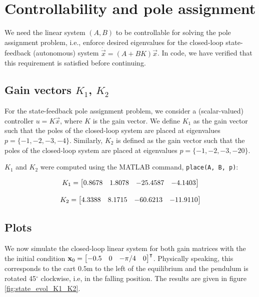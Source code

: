 \documentclass[10pt]{article}
\begin{document}
\section{Controllability and pole assignment}
We need the linear system $(A,B)$ to be controllable for solving the pole assignment problem, i.e., enforce desired eigenvalues for the closed-loop state-feedback (autonomous) system $\dot{\vec{x}} = (A + BK)\vec{x}$. In code, we have verified that this requirement is satisfied before continuing.

\subsection{Gain vectors \texorpdfstring{$K_1$}{K1}, \texorpdfstring{$K_2$}{K2}}
For the state-feedback pole assignment problem, we consider a (scalar-valued) controller $u = K\vec{x}$, where $K$ is the gain vector. We define $K_1$ as the gain vector such that the poles of the closed-loop system are placed at eigenvalues $p =\{-1, -2, -3, -4\}$. Similarly, $K_2$ is defined as the gain vector such that the poles of the closed-loop system are placed at eigenvalues $p =\{-1, -2, -3, -20\}$.

$K_1$ and $K_2$ were computed using the \textsc{MATLAB} command, \texttt{place(A, B, p)}:

\begin{equation*}
    K_1 = \begin{bmatrix} 0.8678 & 1.8078 & -25.4587 & -4.1403 \end{bmatrix}
\end{equation*}

\begin{equation*}
    K_2 = \begin{bmatrix} 4.3388  &  8.1715 & -60.6213 & -11.9110 \end{bmatrix}
\end{equation*}

\subsection{Plots}
We now simulate the closed-loop linear system for both gain matrices with the the initial condition $\mathbf{x}_0 = \begin{bmatrix}  -0.5 & 0 & -\pi/4 & 0 \end{bmatrix}^\intercal$. Physically speaking, this corresponds to the cart $0.5$m to the left of the equilibrium and the pendulum is rotated 45$^\circ$ clockwise, i.e, in the falling position. The results are given in figure \ref{fig:state_evol_K1_K2}.
\end{document}
